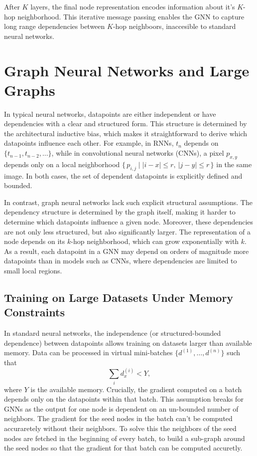 After $K$ layers, the final node representation encodes information about it's $K$-hop neighborhood. This iterative message passing enables the GNN to capture long range dependencies between $K$-hop neighboors, inaccesible to standard neural networks.



\section{Graph Neural Networks and Large Graphs}\label{sec:gnns_large}


In typical neural networks, datapoints are either independent or have dependencies with a clear and structured form. This structure is determined by the architectural inductive bias, which makes it straightforward to derive which datapoints influence each other. For example, in RNNs, $t_n$ depends on $\{t_{n-1}, t_{n-2}, \dots\}$, while in convolutional neural networks (CNNs), a pixel $p_{x,y}$ depends only on a local neighborhood $\{\,p_{i,j} \mid |i-x| \le r,\ |j-y| \le r \,\}$ in the same image.
In both cases, the set of dependent datapoints is explicitly defined and bounded.

In contrast, graph neural networks lack such explicit structural assumptions. The dependency structure is determined by the graph itself, making it harder to determine which datapoints influence a given node. Moreover, these dependencies are not only less structured, but also significantly larger. The representation of a node depends on its $k$-hop neighborhood, which can grow exponentially with $k$. As a result, each datapoint in a GNN may depend on orders of magnitude more datapoints than in models such as CNNs, where dependencies are limited to small local regions.

\subsection{Training on Large Datasets Under Memory Constraints}\label{sec:memory}

In standard neural networks, the independence (or structured-bounded dependence) between datapoints allows training on datasets larger than available memory. Data can be processed in virtual mini-batches $\{d^{(1)}, \dots, d^{(n)}\}$ such that
\[
\sum_i d^{(i)}_x < Y,
\]
where $Y$ is the available memory. Crucially, the gradient computed on a batch depends only on the datapoints within that batch. This assumption breaks for GNNs as the output for one node is dependent on an un-bounded number of neighbors. The gradient for the seed nodes in the batch can't be computed accuraretely without their neighbors. To solve this the neighbors of the seed nodes are fetched in the beginning of every batch, to build a sub-graph around the seed nodes so that the gradient for that batch can be computed accuretly.


